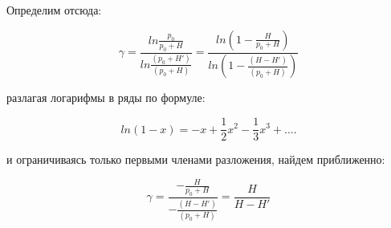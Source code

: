 Определим отсюда:

\begin{equation*}
    \gamma = \frac{ln \frac{p_0}{p_0 + H}}{ln \frac{(p_0 + H')}{(p_0 + H)}} = \frac{ln (1 - \frac{H}{p_0 + H})}{ln(1- \frac{(H - H')}{(p_0 + H)})}
\end{equation*}

разлагая логарифмы в ряды по формуле:

\begin{equation*}
    ln (1-x)  = -x + \frac{1}{2} x^2 -\frac{1}{3} x^3 +....
\end{equation*}

и ограничиваясь только первыми членами разложения, найдем приближенно:

\begin{equation*}
    \gamma = \frac{- \frac{H}{p_0 + H}}{- \frac{(H - H')}{(p_0 + H)}} = \frac{H}{H-H'}
\end{equation*}

